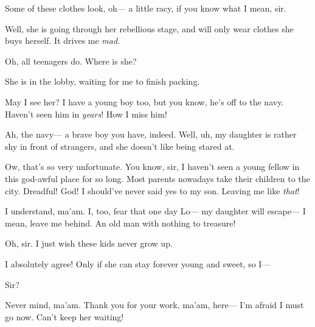 \documentclass[letterpaper,12pt]{article}
\begin{document}
\custodian%
Some of these clothes look, oh--- a little racy, if you know what I mean, sir.

\hum[chuckling]
Well, she is going through her rebellious stage, and will only wear clothes she buys herself. It drives me \textit{mad}.

\custodian%
Oh, all teenagers do. Where is she?

\hum%
She is in the lobby, waiting for me to finish packing.

\custodian%
May I see her? I have a young boy too, but you know, he's off to the navy. Haven't seen him in \textit{years}! How I miss him!

\hum%
Ah, the navy--- a brave boy you have, indeed. Well, uh, my daughter is rather shy in front of strangers, and she doesn't like being stared at.

\custodian%
Ow, that's so very unfortunate. You know, sir, I haven't seen a young fellow in this god-awful place for so long. Most parents nowadays take their children to the city. Dreadful! God! I should've never said yes to my son. Leaving me like \textit{that}!

\hum%
I understand, ma'am. I, too, fear that one day Lo--- my daughter will escape--- I mean, leave me behind. An old man with nothing to treasure!

\custodian%
Oh, sir. I just wish these kids never grow up.

\hum%
I absolutely agree! Only if she can stay forever young and sweet, so I--- 

\custodian%
Sir?

Never mind, ma'am. Thank you for your work, ma'am, here---  I'm afraid I must go now. Can't keep her waiting!
\end{document}
